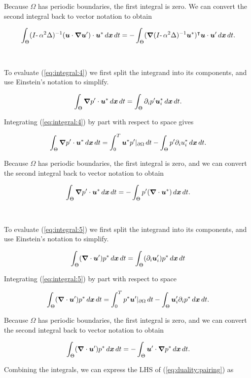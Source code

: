 \noindent Because $\Omega$ has periodic boundaries, the first integral is zero. We can convert the second integral back to vector notation to obtain

$$\int_{\Theta}(I\text{-}\,\alpha^2\Delta)^{-1}(\boldsymbol u\cdot{\boldsymbol \nabla}\boldsymbol u')\cdot \boldsymbol u^* \,d\boldsymbol x\,dt = -\int_{\Theta} ({\boldsymbol \nabla}(I\text{-}\,\alpha^2\Delta)^{-1}\boldsymbol u^*)^\intercal \boldsymbol u \cdot \boldsymbol u' \,d\boldsymbol x\,dt.$$
\\~\\
\noindent To evaluate (\ref{eq:integral:4}) we first split the integrand into its components, and use Einstein's notation to simplify.

$$\int_{\Theta} {\boldsymbol \nabla} p' \cdot \boldsymbol u^* \,d\boldsymbol x\,dt = \int_{\Theta} \partial_i p'\boldsymbol u_i^* \,d\boldsymbol x\,dt.$$

\noindent Integrating (\ref{eq:integral:4}) by part with respect to space gives

$$\int_{\Theta} {\boldsymbol \nabla} p' \cdot \boldsymbol u^* \,d\boldsymbol x\,dt = \int_0^T \boldsymbol u^* p' |_{\partial \Omega} \,dt - \int_{\Theta} p' \partial_i u_i^* \,d\boldsymbol x\,dt.$$

\noindent Because $\Omega$ has periodic boundaries, the first integral is zero, and we can convert the second integral back to vector notation to obtain

$$\int_{\Theta} {\boldsymbol \nabla} p' \cdot \boldsymbol u^* \,d\boldsymbol x\,dt = -\int_{\Theta} p' ({\boldsymbol \nabla}\cdot \boldsymbol u^*) \,d\boldsymbol x\,dt.$$
\\~\\
\noindent To evaluate (\ref{eq:integral:5}) we first split the integrand into its components, and use Einstein's notation to simplify.

$$\int_{\Theta} ({\boldsymbol \nabla} \cdot \boldsymbol u')p^* \,d\boldsymbol x\,dt = \int_{\Theta} (\partial_i \boldsymbol u'_i)p^* \,d\boldsymbol x\,dt$$

\noindent Integrating (\ref{eq:integral:5}) by part with respect to space

$$\int_{\Theta} ({\boldsymbol \nabla} \cdot \boldsymbol u')p^* \,d\boldsymbol x\,dt = \int_0^T p^*\boldsymbol u'|_{\partial \Omega} \,dt - \int_{\Theta} \boldsymbol u'_i \partial_i p^* \,d\boldsymbol x\,dt.$$

\noindent Because $\Omega$ has periodic boundaries, the first integral is zero, and we can convert the second integral back to vector notation to obtain

$$\int_{\Theta} ({\boldsymbol \nabla} \cdot \boldsymbol u')p^* \,d\boldsymbol x\,dt = -\int_{\Theta} \boldsymbol u' \cdot {\boldsymbol \nabla} p^* \,d\boldsymbol x\,dt.$$

\noindent Combining the integrals, we can express the LHS of (\ref{eq:duality:pairing}) as

